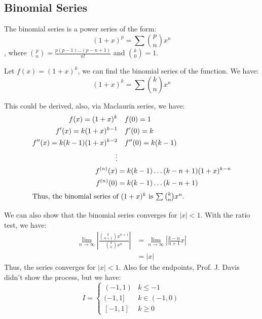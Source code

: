 \documentclass[11pt]{report}
\begin{document}
\subsection{Binomial Series}
\begin{definition}
    The binomial series is a power series of the form:
    \begin{equation}
        (1+x)^p = \sum \binom{p}{n} x^n
    \end{equation}
    , where $\binom{p}{n} = \frac{p(p-1)\ldots(p-n+1)}{n!}$ and $\binom{k}{0} = 1$.
\end{definition}
\begin{example}[$(1+x)^k$]
    Let $f(x) = (1+x)^k$, we can find the binomial series of the function. We have:
    $$
    (1+x)^k = \sum \binom{k}{n} x^n
    $$

    This could be derived, also, via Maclaurin series, we have:
    \begin{align*}
        f(x) = (1+x)^k &\quad f(0) = 1 \\
        f'(x) = k(1+x)^{k-1} &\quad f'(0) = k \\
        f''(x) = k(k-1)(1+x)^{k-2} &\quad f''(0) = k(k-1) \\
        \vdots \\
        f^{(n)}(x) &= k(k-1)\ldots(k-n+1)(1+x)^{k-n} \\
        f^{(n)}(0) &= k(k-1)\ldots(k-n+1) \\
        \intertext{Thus, the binomial series of $(1+x)^k$ is $\sum \binom{k}{n} x^n$.}
    \end{align*}

    We can also show that the binomial series converges for $|x| < 1$. With the ratio test, we have:
    \begin{align*}
        \lim_{n \to \infty} \left| \frac{\binom{k}{n+1} x^{n+1}}{\binom{k}{n} x^n} \right| &= \lim_{n \to \infty} \left| \frac{k-n}{n+1} x \right| \\
        &= |x|
    \end{align*}
    Thus, the series converges for $|x| < 1$. Also for the endpoints, Prof. J. Davis didn't show the process, but we have:
    $$
    I = \begin{cases}
        (-1, 1) & k \le -1 \\
        (-1, 1] & k \in (-1, 0) \\
        [-1, 1] & k \ge 0
    \end{cases}
    $$
\end{example}
\end{document}
